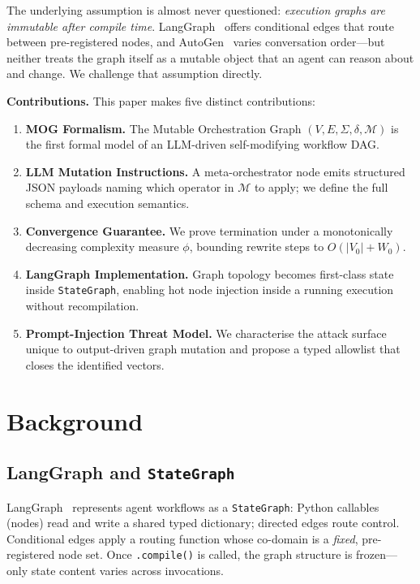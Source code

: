 \documentclass[conference]{IEEEtran}
\begin{document}
The underlying assumption is almost never questioned: \emph{execution
graphs are immutable after compile time}. LangGraph~\cite{langgraph2024}
offers conditional edges that route between pre-registered nodes, and
AutoGen~\cite{autogen2023} varies conversation order---but neither
treats the graph itself as a mutable object that an agent can reason
about and change. We challenge that assumption directly.

\smallskip\noindent\textbf{Contributions.} This paper makes five
distinct contributions:
\begin{enumerate}
  \item \textbf{MOG Formalism.} The Mutable Orchestration Graph
    $(V,E,\Sigma,\delta,\mathcal{M})$ is the first formal model
    of an LLM-driven self-modifying workflow DAG.
  \item \textbf{LLM Mutation Instructions.} A meta-orchestrator
    node emits structured JSON payloads naming which operator in
    $\mathcal{M}$ to apply; we define the full schema and execution
    semantics.
  \item \textbf{Convergence Guarantee.} We prove termination under
    a monotonically decreasing complexity measure $\phi$, bounding
    rewrite steps to $O(|V_0| + W_0)$.
  \item \textbf{LangGraph Implementation.} Graph topology becomes
    first-class state inside \texttt{StateGraph}, enabling hot node
    injection inside a running execution without recompilation.
  \item \textbf{Prompt-Injection Threat Model.} We characterise the
    attack surface unique to output-driven graph mutation and propose
    a typed allowlist that closes the identified vectors.
\end{enumerate}

\section{Background}
\label{sec:background}

\subsection{LangGraph and \texttt{StateGraph}}
LangGraph~\cite{langgraph2024} represents agent workflows as a
\texttt{StateGraph}: Python callables (nodes) read and write a shared
typed dictionary; directed edges route control. Conditional edges
apply a routing function whose co-domain is a \emph{fixed}, pre-registered
node set. Once \texttt{.compile()} is called, the graph structure is
frozen---only state content varies across invocations.
\end{document}
